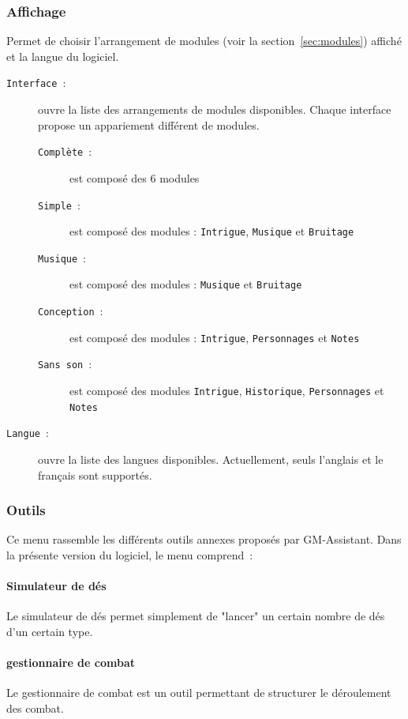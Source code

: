 \documentclass[a4paper,12pt]{article}
\newcommand*{\GMA}{GM-Assistant\xspace}
\newcommand*{\interfaceitem}[1]{\texttt{#1}}
\begin{document}
\subsubsection{Affichage}
Permet de choisir l'arrangement de modules (voir la section~\ref{sec:modules}) affiché et la langue du logiciel.
\begin{description}
    \item[\interfaceitem{Interface}~:]{ouvre la liste des arrangements de modules disponibles.
        Chaque interface propose un appariement différent de modules.}
\begin{description}
  \item[\interfaceitem{Complète}~:]{est composé des 6 modules}
  \item[\interfaceitem{Simple}~:]{est composé des modules : \interfaceitem{Intrigue}, \interfaceitem{Musique} et \interfaceitem{Bruitage}}
  \item[\interfaceitem{Musique}~:]{est composé des modules : \interfaceitem{Musique} et \interfaceitem{Bruitage}}
  \item[\interfaceitem{Conception}~:]{est composé des modules : \interfaceitem{Intrigue}, \interfaceitem{Personnages} et \interfaceitem{Notes}}
  \item[\interfaceitem{Sans son}~:]{est composé des modules \interfaceitem{Intrigue}, \interfaceitem{Historique}, \interfaceitem{Personnages} et \interfaceitem{Notes}}
\end{description}
    \item[\interfaceitem{Langue}~:]{ouvre la liste des langues disponibles.
        Actuellement, seuls l'anglais et le français sont supportés.}
\end{description}

\subsubsection{Outils}
Ce menu rassemble les différents outils annexes proposés par \GMA.
Dans la présente version du logiciel, le menu comprend~:

\paragraph{Simulateur de dés}
Le simulateur de dés permet simplement de "lancer" un certain nombre de dés d'un certain type.

\paragraph{gestionnaire de combat}
Le gestionnaire de combat est un outil permettant de structurer le déroulement des combat.
\end{document}
